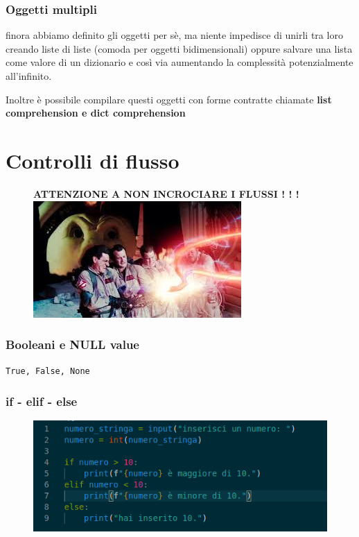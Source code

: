 \documentclass{beamer}
\begin{document}
\begin{frame}
    
    \frametitle{Oggetti multipli}
    finora abbiamo definito gli oggetti per sè, ma niente impedisce di unirli tra loro creando liste di liste (comoda per oggetti bidimensionali) oppure salvare una lista come valore di un dizionario e così via aumentando la complessità potenzialmente all'infinito.
    
    Inoltre è possibile compilare questi oggetti con forme contratte chiamate \textbf{list comprehension e dict comprehension}

\end{frame}

\section{Controlli di flusso}

\begin{frame}
\begin{figure}

    \textbf{ATTENZIONE A NON INCROCIARE I FLUSSI ! ! !}
    \centering
    \includegraphics[width=0.75\linewidth]{flussi.png}
\end{figure}
\end{frame}

\begin{frame}
    \frametitle{Booleani e NULL value}
    \centering
     \texttt{True, False, None}
\end{frame}

\begin{frame}
    
    \frametitle{if - elif - else}
    \begin{figure}
        \centering
        \includegraphics[width=1\linewidth]{if-elif-else.png}
    \end{figure}

\end{frame}
\end{document}
